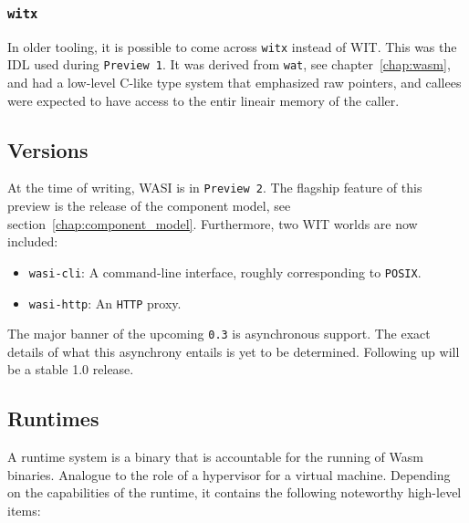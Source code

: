 \subsubsection{\texttt{witx}}

In older tooling, it is possible to come across \texttt{witx} instead of \gls{WIT}. This was the \gls{IDL} used during \texttt{Preview 1}. It was derived from \texttt{wat}, see chapter~\ref{chap:wasm}, and had a low-level C-like type system that emphasized raw pointers, and callees were expected to have access to the entir lineair memory of the caller.

\subsection{Versions}
\label{sec:versions}
At the time of writing, \gls{WASI} is in \texttt{Preview 2}. The flagship feature of this preview is the release of the component model, see section~\ref{chap:component_model}. Furthermore, two \gls{WIT} worlds are now included:

\begin{itemize}
    \item \texttt{wasi-cli}: A command-line interface, roughly corresponding to \texttt{POSIX}.
    \item \texttt{wasi-http}: An \texttt{HTTP} proxy.
\end{itemize}

The major banner of the upcoming \texttt{0.3} is asynchronous support. The exact details of what this asynchrony entails is yet to be determined. Following up will be a stable 1.0 release.

\newpage

\subsection{Runtimes}
\label{sec:runtimes}

A runtime system is a binary that is accountable for the running of \gls{Wasm} binaries. Analogue to the role of a hypervisor for a virtual machine. Depending on the capabilities of the runtime, it contains the following noteworthy high-level items:


